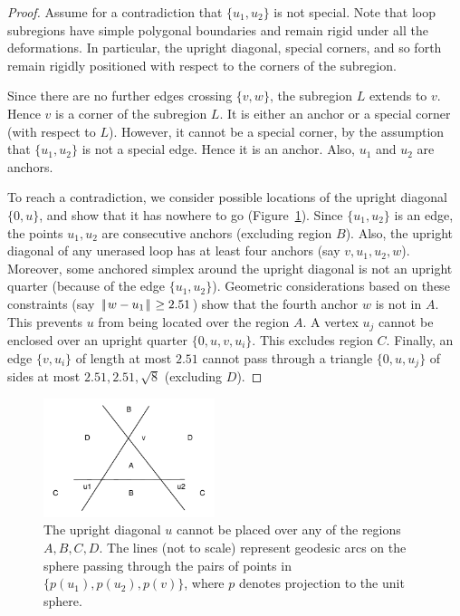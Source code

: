 \documentclass[11pt]{amsart}
\def\|{{\hskip0.1em|\hskip-0.15em|\hskip0.1em}}
\begin{document}
\begin{proof}
Assume for a contradiction that $\{u_1,u_2\}$ is not special.
Note that loop subregions have simple polygonal boundaries and
remain rigid under all the deformations.  In particular,
the upright diagonal, special corners, and so forth
remain rigidly positioned with respect to the corners of the subregion.

Since there are no further edges crossing $\{v,w\}$, the subregion
$L$ extends to $v$.  Hence $v$ is a corner of the subregion $L$.
It is either an anchor or a special corner (with respect to $L$). However, it cannot be a special
corner, by the assumption that $\{u_1,u_2\}$ is not a special edge.
Hence it is an anchor.  Also, $u_1$ and $u_2$ are anchors.

To reach a contradiction, 
we consider possible locations of the upright diagonal $\{0,u\}$,
and show that it has nowhere to go (Figure~\ref{fig:nogo}).  
Since $\{u_1,u_2\}$ is an edge,
the points $u_1,u_2$ are consecutive anchors (excluding region $B$).  
Also, the upright diagonal of any
unerased loop has at least four anchors (say $v,u_1,u_2,w$).  Moreover, some anchored simplex around the upright diagonal is not an upright quarter (because of the edge $\{u_1,u_2\}$).  Geometric considerations based
on these constraints (say $\|w-u_1\|\ge 2.51$) show that
the fourth anchor $w$ is not in $A$.  This prevents $u$ from
being located over the region $A$.
A vertex $u_j$ cannot be enclosed over an upright quarter $\{0,u,v,u_i\}$.  This excludes
 region $C$.  Finally, an edge $\{v,u_i\}$
of length at most $2.51$ cannot pass through a triangle $\{0,u,u_j\}$
of sides at most $2.51,2.51,\sqrt8$ (excluding $D$).
\end{proof}

\begin{figure}
\begin{center}
\includegraphics[width=5cm]{nogo}
\end{center}
\caption{The upright diagonal $u$ cannot be placed over any of
the regions $A,B,C,D$.  The lines (not to scale) represent geodesic arcs on the
sphere passing through the pairs of points in $\{p(u_1),p(u_2),p(v)\}$,
where $p$ denotes projection to the unit sphere.}
\label{fig:nogo}
\end{figure}
\end{document}
